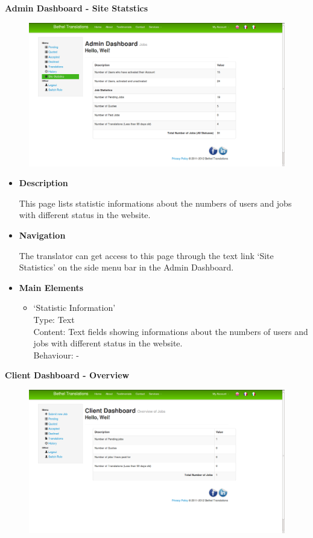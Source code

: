 \documentclass{l3proj}
\begin{document}
\textbf{Admin Dashboard - Site Statstics}
\begin{figure}[H]
\centering
\includegraphics[width=0.8\linewidth]{images/adminDashStatistics}
\vspace{-30pt}
\end{figure}

\begin{itemize}
\item \textbf{Description}

This page lists statistic informations about the numbers of users and jobs with different status in the website.\\

\item \textbf{Navigation}

The translator can get access to this page through the text link `Site Statistics' on the side menu bar in the Admin Dashboard.

\item \textbf{Main Elements}
\begin{itemize}

\item `Statistic Information'\\
Type: Text\\
Content: Text fields showing informations about the numbers of users and jobs with different status in the website.\\
Behaviour: - \\

\end{itemize}
\end{itemize}

\textbf{Client Dashboard - Overview}
\begin{figure}[H]
\centering
\includegraphics[width=0.8\linewidth]{images/clientDashOverview}
\vspace{-30pt}
\end{figure}
\end{document}
